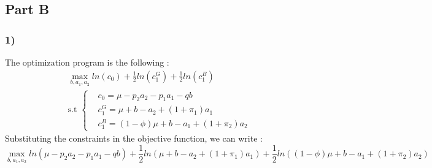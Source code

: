 \documentclass{article}
\begin{document}
\subsection{Part B}
\subsubsection{1)}
The optimization program is the following : 
$$\begin{aligned}
    \max _{b,a_1,a_2} ln(c_0) + \frac{1}{2}ln(c_1^G)+\frac{1}{2}ln(c_1^B) \\
    \text{s.t }\left\{\begin{aligned}
    &c_0 = \mu-p_2a_2-p_1a_1-qb\\
    &c_1^G= \mu +b-a_2+(1+\pi_1)a_1\\
    &c_1^B = (1-\phi)\mu +  b-a_1+(1+\pi_2)a_2
\end{aligned}\right.
\end{aligned}$$
Substituting the constraints in the objective function, we can write : 
$$\max_{b,a_1,a_2} ln(\mu-p_2a_2-p_1a_1-qb) +  \frac{1}{2}ln(\mu +b-a_2+(1+\pi_1)a_1) + \frac{1}{2}ln((1-\phi)\mu +  b-a_1+(1+\pi_2)a_2)$$
\end{document}
